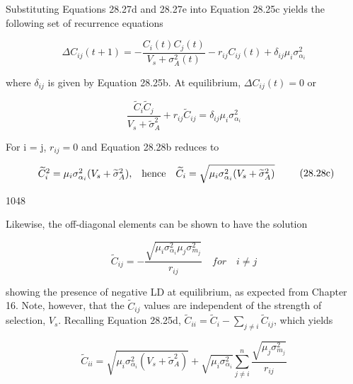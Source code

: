 \documentclass{article}
\begin{document}
Substituting Equations 28.27d and 28.27e into Equation 28.25c yields the following set of recurrence equations

\begin{equation}
\Delta C_{ij}(t+1)=-\frac{C_{i}(t)C_{j}(t)}{V_{s}+\sigma_{A}^{2}(t)}-r_{ij}C_{ij}(t)+\delta_{ij}\mu_{i}\sigma_{\alpha_{i}}^{2}
\tag{28.28a}
\label{eq:28_28a}
\end{equation}

where  $ \delta_{ij} $ is given by Equation 28.25b. At equilibrium,  $ \Delta C_{ij}(t) = 0 $ or

\begin{equation}
\frac{\widetilde{C}_{i}\widetilde{C}_{j}}{V_{s}+\widetilde{\sigma}_{A}^{2}}+r_{ij}\widetilde{C}_{ij}=\delta_{ij}\mu_{i}\sigma_{\alpha_{i}}^{2}
\tag{28.28b}
\label{eq:28_28b}
\end{equation}

For i = j,  $ r_{ij} = 0 $ and Equation 28.28b reduces to

\begin{equation}
\begin{array}{r l}{\widetilde{C}_{i}^{2}=\mu_{i}\sigma_{\alpha_{i}}^{2}(V_{s}+\widetilde{\sigma}_{A}^{2}),}&{{}\mathrm{h e n c e}\quad\widetilde{C}_{i}=\sqrt{\mu_{i}\sigma_{\alpha_{i}}^{2}(V_{s}+\widetilde{\sigma}_{A}^{2})}}\end{array}
\tag{28.28c}
\label{eq:28_28c}
\end{equation}

1048

Likewise, the off-diagonal elements can be shown to have the solution

\begin{equation}
\widetilde{C}_{ij}=-\frac{\sqrt{\mu_{i}\sigma_{\alpha_{i}}^{2}\mu_{j}\sigma_{m_{j}}^{2}}}{r_{ij}}\quad for\quad i\neq j
\tag{28.28d}
\label{eq:28_28d}
\end{equation}

showing the presence of negative LD at equilibrium, as expected from Chapter 16. Note, however, that the  $ \tilde{C}_{ij} $ values are independent of the strength of selection,  $ V_s $. Recalling Equation 28.25d,  $ \tilde{C}_{ii} = \tilde{C}_i - \sum_{j \neq i} \tilde{C}_{ij} $, which yields

\begin{equation}
\widetilde{C}_{ii}=\sqrt{\mu_{i}\sigma_{\alpha_{i}}^{2}(V_{s}+\widetilde{\sigma}_{A}^{2})}+\sqrt{\mu_{i}\sigma_{\alpha_{i}}^{2}}\sum_{j\neq i}^{n}\frac{\sqrt{\mu_{j}\sigma_{m_{j}}^{2}}}{r_{ij}}
\tag{28.28e}
\label{eq:28_28e}
\end{equation}
\end{document}
